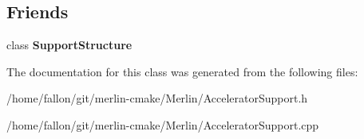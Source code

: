 \subsection*{Friends}
\begin{DoxyCompactItemize}
\item 
\mbox{\label{classAcceleratorSupport_aa2dd076947a17c6edbad646011d1b9c8}} 
class {\bfseries Support\+Structure}
\end{DoxyCompactItemize}


The documentation for this class was generated from the following files\+:\begin{DoxyCompactItemize}
\item 
/home/fallon/git/merlin-\/cmake/\+Merlin/Accelerator\+Support.\+h\item 
/home/fallon/git/merlin-\/cmake/\+Merlin/Accelerator\+Support.\+cpp\end{DoxyCompactItemize}
